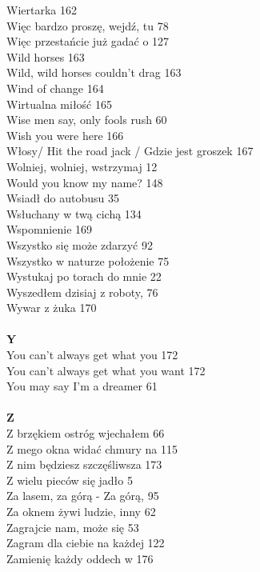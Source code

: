 \documentclass[a5paper, 10pt]{book}
\begin{document}
{\begin{multicols}{3}
    Wiertarka 162\\
    Więc bardzo proszę, wejdź, tu 78\\
    Więc przestańcie już gadać o 127\\
    Wild horses 163\\
    Wild, wild horses couldn't drag 163\\
    Wind of change 164\\
    Wirtualna miłość 165\\
    Wise men say, only fools rush 60\\
    Wish you were here 166\\
    Włosy/ Hit the road jack / Gdzie jest groszek 167\\
    Wolniej, wolniej, wstrzymaj 12\\
    Would you know my name? 148\\
    Wsiadł do autobusu 35\\
    Wsłuchany w twą cichą 134\\
    Wspomnienie 169\\
    Wszystko się może zdarzyć 92\\
    Wszystko w naturze położenie 75\\
    Wystukaj po torach do mnie 22\\
    Wyszedłem dzisiaj z roboty, 76\\
    Wywar z żuka 170\\
    \\
    {\footnotesize \textbf{Y\\} }
    You can't always get what you 172\\
    You can't always get what you want 172\\
    You may say I'm a dreamer 61\\
    \\
    {\footnotesize \textbf{Z\\} }
    Z brzękiem ostróg wjechałem 66\\
    Z mego okna widać chmury na 115\\
    Z nim będziesz szczęśliwsza 173\\
    Z wielu pieców się jadło 5\\
    Za lasem, za górą - Za górą, 95\\
    Za oknem żywi ludzie, inny 62\\
    Zagrajcie nam, może się 53\\
    Zagram dla ciebie na każdej 122\\
    Zamienię każdy oddech w 176\\

\end{multicols}}
\end{document}
